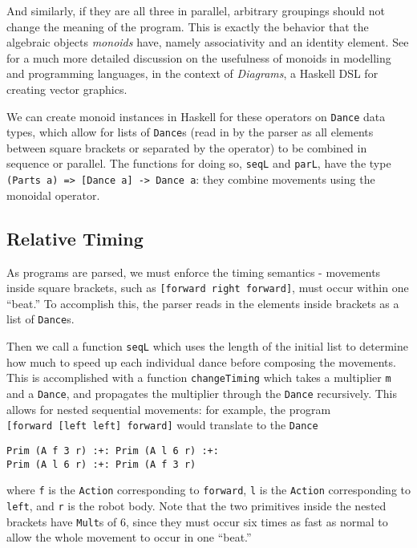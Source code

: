 \documentclass[sigconf]{acmart}
\begin{document}
And similarly, if they are all three in parallel, arbitrary groupings
should not change the meaning of the program. This is exactly the
behavior that the algebraic objects \emph{monoids} have, namely
associativity and an identity element. See \cite{yorgey2012monoids} for a much more
detailed discussion on the usefulness of monoids in modelling and
programming languages, in the context of \emph{Diagrams}, a Haskell DSL
for creating vector graphics.

We can create monoid instances in Haskell for these operators on
\texttt{Dance} data types, which allow for lists of \texttt{Dance}s
(read in by the parser as all elements between square brackets or
separated by the \texttt{\textbar{}\textbar{}} operator) to be combined
in sequence or parallel. The functions for doing so, \texttt{seqL} and
\texttt{parL}, have the type
\texttt{(Parts\ a)\ =\textgreater{}\ {[}Dance\ a{]}\ -\textgreater{}\ Dance\ a}:
they combine movements using the monoidal operator.


\subsection{Relative Timing}\label{relative-timing}

As programs are parsed, we must enforce the timing semantics - movements
inside square brackets, such as \texttt{{[}forward\ right\ forward{]}},
must occur within one ``beat.'' To accomplish this, the parser reads in
the elements inside brackets as a list of \texttt{Dance}s.

Then we call a function \texttt{seqL} which uses the length of the
initial list to determine how much to speed up each individual dance
before composing the movements. This is accomplished with a function
\texttt{changeTiming} which takes a multiplier \texttt{m} and a
\texttt{Dance}, and propagates the multiplier through the \texttt{Dance}
recursively. This allows for nested sequential movements: for example,
the program \texttt{{[}forward\ {[}left\ left{]}\ forward{]}} would
translate to the \texttt{Dance}

\begin{verbatim}
Prim (A f 3 r) :+: Prim (A l 6 r) :+: 
Prim (A l 6 r) :+: Prim (A f 3 r)
\end{verbatim}

where \texttt{f} is the \texttt{Action} corresponding to
\texttt{forward}, \texttt{l} is the \texttt{Action} corresponding to
\texttt{left}, and \texttt{r} is the robot body. Note that the two
primitives inside the nested brackets have \texttt{Mult}s of 6, since
they must occur six times as fast as normal to allow the whole movement
to occur in one ``beat.''
\end{document}
